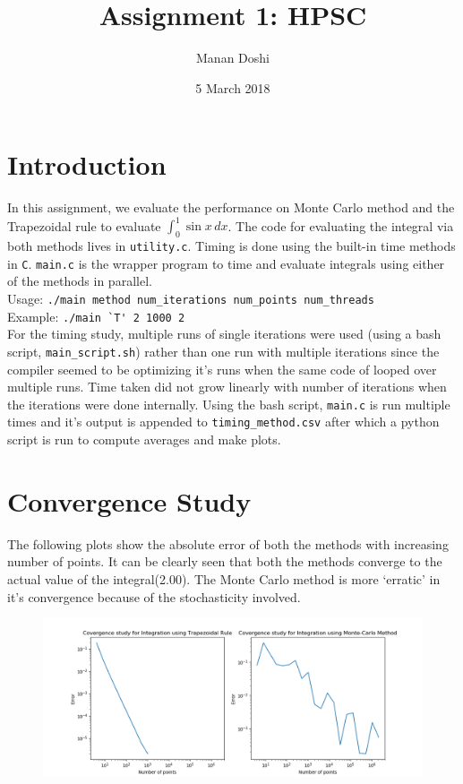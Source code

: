\documentclass{article}
\title{Assignment 1: HPSC}
\author{Manan Doshi}
\date{5 March 2018}
\begin{document}
\graphicspath{{/}}
\maketitle

\section{Introduction}
In this assignment, we evaluate the performance on Monte Carlo method and the Trapezoidal rule to evaluate \(\int_{0}^{1} \sin x \, dx \). The code for evaluating the integral via both methods lives in \texttt{utility.c}. Timing is done using the built-in time methods in \texttt{C}. \texttt{main.c} is the wrapper program to time and evaluate integrals using either of the methods in parallel.\\

Usage: \verb|./main method num_iterations num_points num_threads|\\
Example: \verb|./main `T' 2 1000 2|\\

For the timing study, multiple runs of single iterations were used (using a bash script, \texttt{main\_script.sh}) rather than one run with multiple iterations since the compiler seemed to be optimizing it's runs when the same code of looped over multiple runs. Time taken did not grow linearly with number of iterations when the iterations were done internally. Using the bash script, \texttt{main.c} is run multiple times and it's output is appended to \texttt{timing\_method.csv} after which a python script is run to compute averages and make plots.

\section{Convergence Study}
The following plots show the absolute error of both the methods with increasing number of points. It can be clearly seen that both the methods converge to the actual value of the integral(2.00). The Monte Carlo method is more `erratic' in it's convergence because of the stochasticity involved.

\begin{figure}[h!]
\centering
\includegraphics[scale=0.5]{conv}
\end{figure}
\end{document}
